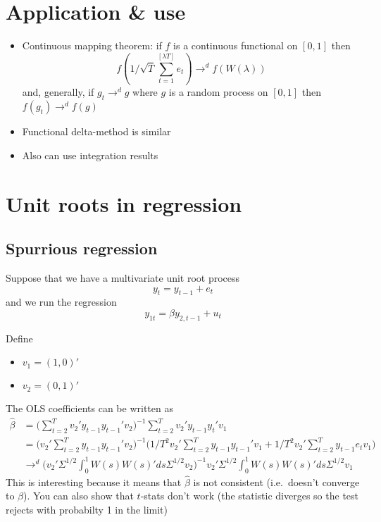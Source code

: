 \section{Application \& use}

\begin{itemize}
\item Continuous mapping theorem: if $f$ is a continuous functional on
  $[0,1]$ then \[f(1/\sqrt{T} \sum_{t=1}^{[λT]} e_t) →^d f(W(λ))\]
  and, generally, if $g_t →^d g$ where $g$ is a random process on
  $[0,1]$ then $f(g_t) →^d f(g)$
\item Functional delta-method is similar
\item Also can use integration results
\end{itemize}

\section{Unit roots in regression}

\subsection{Spurrious regression}

Suppose that we have a multivariate unit root process
\[y_t = y_{t-1} + e_t\] and we run the regression
\[y_{1t} = β y_{2,t-1} + u_t\]

Define

\begin{itemize}
\item $v_1 = (1, 0)'$
\item $v_2 = (0, 1)'$
\end{itemize}

The OLS coefficients can be written as
\begin{equation}
  \begin{split}
    \hat β &= \Big(\sum_{t=2}^T v_2' y_{t-1} y_{t-1}' v_2\Big)^{-1}
    \sum_{t=2}^T v_2' y_{t-1} y_t' v_1 \\
    &= \Big(v_2' \sum_{t=2}^T y_{t-1} y_{t-1}' v_2 \Big)^{-1} \Big(
    1/T^2 v_2' \sum_{t=2}^T y_{t-1} y_{t-1}' v_1
    + 1/T^2 v_2' \sum_{t=2}^T y_{t-1} e_t v_1 \Big) \\
    &→^d \Big(v_2' Σ^{1/2} \int_0^1 W(s) W(s)' ds Σ^{1/2}
    v_2\Big)^{-1} v_2' Σ^{1/2} \int_0^1 W(s) W(s)' ds Σ^{1/2} v_1
\end{split}
\end{equation}
This is interesting because it means that $\hat β$ is not consistent
(i.e.~doesn't converge to $β$). You can also show that $t$-stats don't
work (the statistic diverges so the test rejects with probabilty 1 in
the limit)

